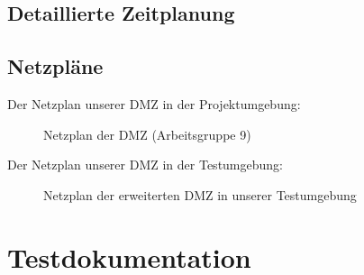 

\clearpage

\subsection{Detaillierte Zeitplanung}
\label{app:Zeitplanung}
\clearpage



\clearpage

\subsection{Netzpläne}
\label{app:Netzplan}
Der Netzplan unserer DMZ in der Projektumgebung:
\begin{figure}[htb]
\centering
{}
\caption{Netzplan der DMZ (Arbeitsgruppe 9)}
\end{figure}

Der Netzplan unserer DMZ in der Testumgebung:
\begin{figure}[htb]
    \centering
    \caption{Netzplan der erweiterten DMZ in unserer Testumgebung}
\end{figure}
\clearpage

\section{Testdokumentation}
\label{app:Test}


